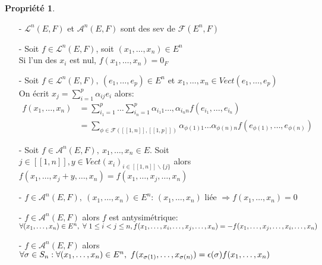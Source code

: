 \documentclass[fleqn]{article}
\theoremstyle{definition} \newtheorem*{defi}{D\'efinition}
\theoremstyle{definition} \newtheorem*{theo}{Th\'eor\`eme}
\theoremstyle{definition} \newtheorem*{coro}{Corollaire}
\theoremstyle{definition} \newtheorem*{nota}{Notation}
\theoremstyle{definition} \newtheorem*{vocab}{Vocabulaire}
\theoremstyle{remark} \newtheorem*{rqs}{Remarques}
\theoremstyle{definition} \newtheorem*{prop}{Propri\'et\'e}
\begin{document}
\begin{prop} $ $
	\begin{itemize}
		\item [-] $\mathscr{L}^n(E,F)$ et $\mathscr{A}^n(E,F)$ sont des sev de $\mathscr{F}(E^n,F)$
		\item [-] Soit $f \in \mathscr{L}^n(E,F)$, soit $(x_1, \hdots, x_n) \in E^n$\\Si l'un des $x_i$ est nul,
			\mbox{$f(x_1, \hdots, x_n) = 0_F$}
		\item [-] Soit $f \in \mathscr{L}^n(E,F),\ (e_1, \hdots, e_p) \in E^n$ et $x_1, \hdots, x_n \in Vect(e_1, \hdots, e_p)$\\On \'ecrit
			$x_j = \sum_{i=1}^p \alpha_{ij} e_i$ alors:
			\begin{align*}
				f(x_1, \hdots, x_n) &= \sum_{i_1 = 1}^p \hdots \sum_{i_n = 1}^p \alpha_{i_1 1} \hdots, \alpha_{i_n n}
					f(e_{i_1}, \hdots, e_{i_n})\\
									&= \sum_{\phi \in \mathscr{F}([\![1,n]\!], [\![1,p]\!])} \alpha_{\phi(1) 1} \hdots \alpha_{\phi(n) n}
					f(e_{\phi(1)}, \hdots, e_{\phi(n)})
			\end{align*}
		\item [-] Soit $f \in \mathscr{A}^n(E,F),\ x_1, \hdots, x_n \in E$. Soit $j \in [\![1,n]\!], y \in Vect(x_i)_{i \in [\![1,n]\!]
			\backslash \{j\}}$ alors $f(x_1, \hdots, x_j + y, \hdots, x_n) = f(x_1, \hdots, x_j, \hdots, x_n)$
		\item [-] $f \in \mathscr{A}^n(E,F),\ (x_1, \hdots, x_n) \in E^n$: $(x_1, \hdots, x_n)$ li\'ee $\Rightarrow f(x_1, \hdots, x_n) = 0$
		\item [-] $f \in \mathscr{A}^n(E,F)$ alors $f$ est antysim\'etrique: \\
			$\forall (x_1, \hdots, x_n) \in E^n,\ \forall\ 1 \leq i < j \leq n,\\
			f(x_1, \hdots, x_i, \hdots, x_j, \hdots, x_n) = -f(x_1, \hdots, x_j, \hdots, x_i, \hdots, x_n)$
		\item [-] $f \in \mathscr{A}^n(E,F)$ alors $\forall \sigma \in S_n:\\ \forall (x_1, \hdots, x_n) \in E^n,\ f(x_{\sigma(1)}, \hdots,
			x_{\sigma(n)}) = \epsilon(\sigma)f(x_1, \hdots, x_n)$
	\end{itemize}
\end{prop}
\end{document}
